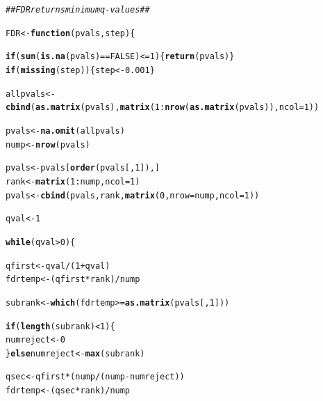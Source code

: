 \documentclass[11pt, a4paper]{article}\usepackage[]{graphicx}\usepackage[]{color}
\makeatletter
\newcommand{\hlnum}[1]{\textcolor[rgb]{0.686,0.059,0.569}{#1}}%
\newcommand{\hlcom}[1]{\textcolor[rgb]{0.678,0.584,0.686}{\textit{#1}}}%
\newcommand{\hlopt}[1]{\textcolor[rgb]{0,0,0}{#1}}%
\newcommand{\hlstd}[1]{\textcolor[rgb]{0.345,0.345,0.345}{#1}}%
\newcommand{\hlkwa}[1]{\textcolor[rgb]{0.161,0.373,0.58}{\textbf{#1}}}%
\newcommand{\hlkwb}[1]{\textcolor[rgb]{0.69,0.353,0.396}{#1}}%
\newcommand{\hlkwc}[1]{\textcolor[rgb]{0.333,0.667,0.333}{#1}}%
\newcommand{\hlkwd}[1]{\textcolor[rgb]{0.737,0.353,0.396}{\textbf{#1}}}%
\newenvironment{kframe}{%
 \def\at@end@of@kframe{}%
 \ifinner\ifhmode%
  \def\at@end@of@kframe{\end{minipage}}%
  \begin{minipage}{\columnwidth}%
 \fi\fi%
 \def\FrameCommand##1{\hskip\@totalleftmargin \hskip-\fboxsep
 \colorbox{shadecolor}{##1}\hskip-\fboxsep
     \hskip-\linewidth \hskip-\@totalleftmargin \hskip\columnwidth}%
 \MakeFramed {\advance\hsize-\width
   \@totalleftmargin\z@ \linewidth\hsize
   \@setminipage}}%
 {\par\unskip\endMakeFramed%
 \at@end@of@kframe}
\newenvironment{knitrout}{}{} %
\makeatother
\begin{document}
\begin{footnotesize}
\begin{knitrout}
\begin{kframe}
\begin{alltt}
    \hlcom{## FDR returns minimum q-values ##}

    \hlstd{FDR} \hlkwb{<-} \hlkwa{function}\hlstd{(}\hlkwc{pvals}\hlstd{,} \hlkwc{step}\hlstd{) \{}

        \hlkwa{if} \hlstd{(}\hlkwd{sum}\hlstd{(}\hlkwd{is.na}\hlstd{(pvals)} \hlopt{==} \hlnum{FALSE}\hlstd{)} \hlopt{<=} \hlnum{1}\hlstd{) \{}\hlkwd{return}\hlstd{(pvals)\}}
        \hlkwa{if} \hlstd{(}\hlkwd{missing}\hlstd{(step)) \{step} \hlkwb{<-} \hlnum{0.001}\hlstd{\}}

        \hlstd{allpvals} \hlkwb{<-} \hlkwd{cbind}\hlstd{(}\hlkwd{as.matrix}\hlstd{(pvals),} \hlkwd{matrix}\hlstd{(}\hlnum{1}\hlopt{:}\hlkwd{nrow}\hlstd{(}\hlkwd{as.matrix}\hlstd{(pvals)),} \hlkwc{ncol} \hlstd{=} \hlnum{1}\hlstd{))}

        \hlstd{pvals} \hlkwb{<-} \hlkwd{na.omit}\hlstd{(allpvals)}
        \hlstd{nump} \hlkwb{<-} \hlkwd{nrow}\hlstd{(pvals)}

        \hlstd{pvals} \hlkwb{<-} \hlstd{pvals[}\hlkwd{order}\hlstd{(pvals[,} \hlnum{1}\hlstd{]), ]}
        \hlstd{rank} \hlkwb{<-} \hlkwd{matrix}\hlstd{(}\hlnum{1}\hlopt{:}\hlstd{nump,} \hlkwc{ncol} \hlstd{=} \hlnum{1}\hlstd{)}
        \hlstd{pvals} \hlkwb{<-} \hlkwd{cbind}\hlstd{(pvals, rank,} \hlkwd{matrix}\hlstd{(}\hlnum{0}\hlstd{,} \hlkwc{nrow} \hlstd{= nump,} \hlkwc{ncol} \hlstd{=} \hlnum{1}\hlstd{))}

        \hlstd{qval} \hlkwb{<-} \hlnum{1}

        \hlkwa{while} \hlstd{(qval} \hlopt{>} \hlnum{0}\hlstd{) \{}

            \hlstd{qfirst} \hlkwb{<-} \hlstd{qval} \hlopt{/} \hlstd{(}\hlnum{1} \hlopt{+} \hlstd{qval)}
            \hlstd{fdrtemp} \hlkwb{<-} \hlstd{(qfirst} \hlopt{*} \hlstd{rank)} \hlopt{/} \hlstd{nump}

            \hlstd{subrank} \hlkwb{<-} \hlkwd{which}\hlstd{(fdrtemp} \hlopt{>=} \hlkwd{as.matrix}\hlstd{(pvals[,} \hlnum{1}\hlstd{]))}

            \hlkwa{if} \hlstd{(}\hlkwd{length}\hlstd{(subrank)} \hlopt{<} \hlnum{1}\hlstd{) \{}
                \hlstd{numreject} \hlkwb{<-} \hlnum{0}
            \hlstd{\}} \hlkwa{else} \hlstd{numreject} \hlkwb{<-} \hlkwd{max}\hlstd{(subrank)}

            \hlstd{qsec} \hlkwb{<-} \hlstd{qfirst} \hlopt{*} \hlstd{(nump} \hlopt{/} \hlstd{(nump} \hlopt{-} \hlstd{numreject))}
            \hlstd{fdrtemp} \hlkwb{<-} \hlstd{(qsec} \hlopt{*} \hlstd{rank)} \hlopt{/} \hlstd{nump}


\end{alltt}
\end{kframe}
\end{knitrout}
\end{footnotesize}
\end{document}
